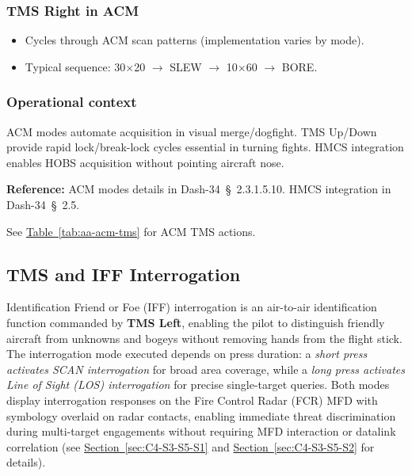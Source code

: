 \documentclass[11pt, a4paper, twoside]{report}
\newcommand{\dashref}[1]{Dash-34~\S~#1}
\newcommand{\secref}[1]{\hyperref[#1]{Section~\ref*{#1}}}
\newcommand{\tabref}[1]{\hyperref[#1]{Table~\ref*{#1}}}
\begin{document}
\subsubsection*{TMS Right in ACM}
\label{sec:C4-S3-S4-S3}

\begin{itemize}[nosep]
    \item Cycles through ACM scan patterns (implementation varies by mode).
    \item Typical sequence: 30$\times$20 $\rightarrow$ SLEW $\rightarrow$ 10$\times$60 $\rightarrow$ BORE.
\end{itemize}

\subsubsection*{Operational context}
\label{sec:C4-S3-S4-S4}

ACM modes automate acquisition in visual merge/dogfight. TMS Up/Down provide 
rapid lock/break-lock cycles essential in turning fights. HMCS integration 
enables HOBS acquisition without pointing aircraft nose.

\textbf{Reference:} ACM modes details in \dashref{2.3.1.5.10}. HMCS 
integration in \dashref{2.5}.

See \tabref{tab:aa-acm-tms} for ACM TMS actions.


\subsection{TMS and IFF Interrogation}
\label{sec:C4-S3-S5}

Identification Friend or Foe (IFF) interrogation is an air-to-air identification function commanded by \textbf{TMS Left}, enabling the pilot to distinguish friendly aircraft from unknowns and bogeys without removing hands from the flight stick. The interrogation mode executed depends on press duration: a \textit{short press activates SCAN interrogation} for broad area coverage, while a \textit{long press activates Line of Sight (LOS) interrogation} for precise single-target queries. Both modes display interrogation responses on the Fire Control Radar (FCR) MFD with symbology overlaid on radar contacts, enabling immediate threat discrimination during multi-target engagements without requiring MFD interaction or datalink correlation (see \secref{sec:C4-S3-S5-S1} and \secref{sec:C4-S3-S5-S2} for details).
\end{document}
